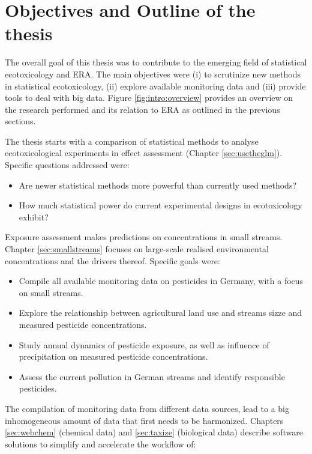 \section{Objectives and Outline of the thesis}

The overall goal of this thesis was to contribute to the emerging field of statistical ecotoxicology and ERA.
The main objectives were (i) to scrutinize new methods in statistical ecotoxicology,
(ii) explore available monitoring data and
(iii) provide tools to deal with big data.
Figure \ref{fig:intro:overview} provides an overview on the research performed and its relation to ERA as outlined in the previous sections.

The thesis starts with a comparison of statistical methods to analyse ecotoxicological experiments in effect assessment (Chapter \ref{sec:usetheglm}). 
Specific questions addressed were:

\begin{itemize}
	\item Are newer statistical methods more powerful than currently used methods?
	\item How much statistical power do current experimental designs in ecotoxicology exhibit?
\end{itemize}


\noindent Exposure assessment makes predictions on concentrations in small streams.
Chapter \ref{sec:smallstreams} focuses on large-scale realised environmental concentrations and the drivers thereof. 
Specific goals were:
\begin{itemize}
	\item Compile all available monitoring data on pesticides in Germany, with a focus on small streams.
	\item Explore the relationship between agricultural land use and streams sizze and measured pesticide concentrations.
	\item Study annual dynamics of pesticide exposure, as well as influence of precipitation on measured pesticide concentrations.
	\item Assess the current pollution in German streams and identify responsible pesticides.
\end{itemize}

\noindent
The compilation of monitoring data from different data sources, lead to a big inhomogeneous amount of data that first needs to be harmonized.
Chapters \ref{sec:webchem} (chemical data) and \ref{sec:taxize} (biological data) describe software solutions to simplify and accelerate the workflow of:

